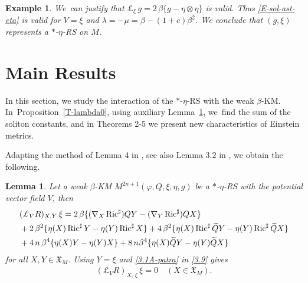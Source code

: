 \documentclass[11pt,a4paper,twoside]{article}
\newtheorem{example}{Example}%
\newtheorem{lemma}{Lemma}%
\def\Ric{\operatorname{Ric}}
\begin{document}
{\begin{example}
We~can justify that $\pounds_\xi\,g=2\,\beta\{g-\eta\otimes\eta\}$ is valid.
Thus \eqref{E-sol-ast-eta} is valid for $V=\xi$ and $\lambda=-\mu=\beta-(1+c)\beta^2$.
We conclude that $(g,\xi)$ represents a $\ast$-$\eta$-RS on $M$.
\end{example}


\section{Main Results}
\label{sec:04}

In this section, we study the interaction of the $\ast$-$\eta$-RS with the weak $\beta$-KM.
In~Proposition~\ref{T-lambda0}, using auxiliary Lemma~\ref{lem3.2}, we~find the sum of the soliton constants,
and in Theorems 2-5 we present new characteristics of Einstein metrics.


Adapting the method of Lemma 4 in \cite{rov-126}, see also Lemma 3.2 in \cite{ven-2022}, we obtain the following.

\begin{lemma}\label{lem3.2}
Let a weak $\beta$-KM $M^{2n+1}(\varphi,Q,\xi,\eta,g)$ be a $\ast$-$\eta$-RS with the potential vector field $V$, then
\begin{align}\label{3.9}
\notag
 & (\pounds_{V} R)_{X,Y}\,\xi = 2\,\beta\{(\nabla_X\Ric^\sharp)Q Y - (\nabla_Y\Ric^\sharp)Q X\} \\
\notag
 & +2\,\beta^2 \{\eta(X)\Ric^\sharp Y-\eta(Y)\Ric^\sharp X\}
 + 4\,\beta^2\{\eta(X)\Ric^\sharp \widetilde QY - \eta(Y)\Ric^\sharp \widetilde QX\} \\
 & + 4\,n\,\beta^4\{\eta(X) Y - \eta(Y) X\} + 8\,n\beta^4\{\eta(X)\widetilde Q Y - \eta(Y)\widetilde Q X\}
\end{align}
for all $X,Y\in\mathfrak{X}_M$.
Using $Y=\xi$ and \eqref{3.1A-patra} in \eqref{3.9} gives
\begin{align}\label{E-3.18}
 (\pounds_V R)_{X,\,\xi}\,\xi = 0 \quad (X\in\mathfrak{X}_M).
\end{align}
\end{lemma}

}
\end{document}
